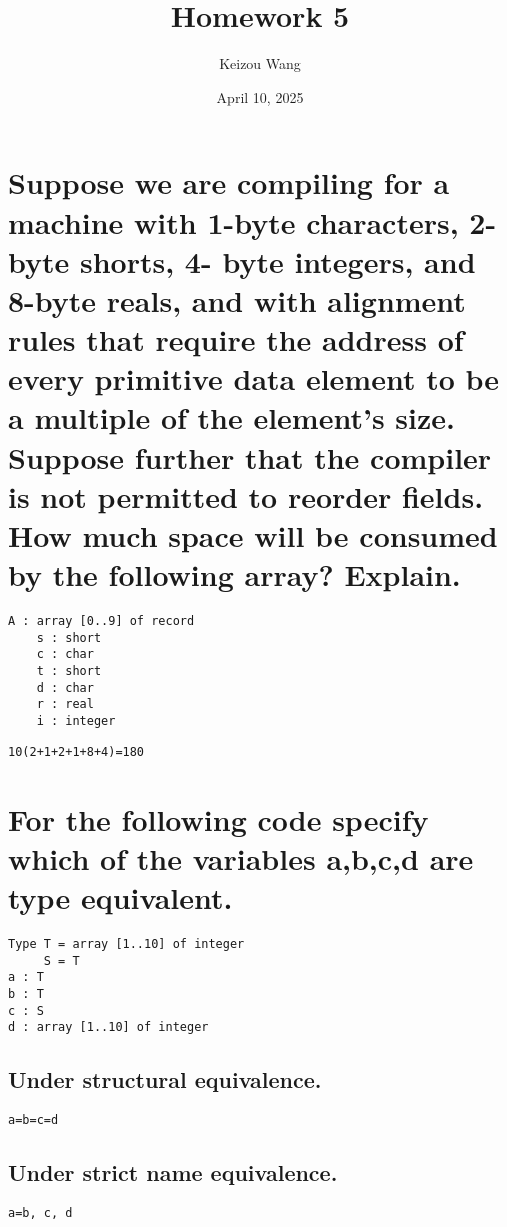 \documentclass[letterpaper]{article}
\title{Homework 5}
\author{Keizou Wang}
\date{April 10, 2025}
\begin{document}
\maketitle

\section{Suppose we are compiling for a machine with 1-byte characters, 2-byte shorts, 4- byte integers, and 8-byte reals, and with alignment rules that require the address of every primitive data element to be a multiple of the element's size. Suppose further that the compiler is not permitted to reorder fields. How much space will be consumed by the following array? Explain.}
\begin{adjustwidth}{2.35em}{0pt}
\begin{Verbatim}[tabsize=4]
A : array [0..9] of record
	s : short
	c : char
	t : short
	d : char
	r : real
	i : integer
\end{Verbatim}
\begin{Verbatim}[tabsize=4]
10(2+1+2+1+8+4)=180
\end{Verbatim}
\end{adjustwidth}

\section{For the following code specify which of the variables a,b,c,d are type equivalent.}
\begin{adjustwidth}{2.35em}{0pt}
\begin{Verbatim}[tabsize=4]
Type T = array [1..10] of integer
     S = T
a : T
b : T
c : S
d : array [1..10] of integer
\end{Verbatim}
\end{adjustwidth}
\subsection{Under structural equivalence.}
\begin{adjustwidth}{2.35em}{0pt}
\begin{Verbatim}[tabsize=4]
a=b=c=d 
\end{Verbatim}
\end{adjustwidth}
\subsection{Under strict name equivalence.}
\begin{adjustwidth}{2.35em}{0pt}
\begin{Verbatim}[tabsize=4]
a=b, c, d
\end{Verbatim}
\end{adjustwidth}
\end{document}
